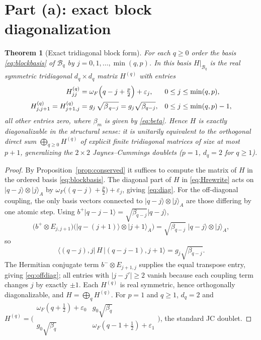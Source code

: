\documentclass[12pt]{article}
\newtheorem{theorem}{Theorem}
\theoremstyle{definition}
\theoremstyle{remark}
\newcommand{\ket}[1]{\lvert #1\rangle}
\newcommand{\bp}{b^{+}}
\newcommand{\bm}{b^{-}}
\begin{document}
\section{Part (a): exact block diagonalization}

\begin{theorem}[Exact tridiagonal block form]\label{thm:blocks}
For each $q\ge0$ order the basis \eqref{eq:blockbasis} of $\mathcal B_q$ by
$j=0,1,\dots,\min(q,p)$. In this basis $H|_{\mathcal B_q}$ is the real symmetric
tridiagonal $d_q\times d_q$ matrix $H^{(q)}$ with entries
\begin{align}
H^{(q)}_{jj}&=\omega_F\Bigl(q-j+\tfrac p2\Bigr)+\varepsilon_j,
&& 0\le j\le \min(q,p),\label{eq:diag}\\
H^{(q)}_{j,j+1}=H^{(q)}_{j+1,j}&=g_j\,\sqrt{\beta_{\,q-j}}
=g_j\sqrt{\beta_{q-j}},
&& 0\le j\le \min(q,p)-1,\label{eq:offdiag}
\end{align}
all other entries zero, where $\beta_m$ is given by \eqref{eq:beta}. Hence $H$ is
exactly diagonalizable in the structural sense: it is unitarily equivalent to the
orthogonal direct sum $\bigoplus_{q\ge0} H^{(q)}$ of explicit finite tridiagonal
matrices of size at most $p+1$, generalizing the $2\times2$ Jaynes--Cummings
doublets ($p=1$, $d_q=2$ for $q\ge1$).
\end{theorem}

\begin{proof}
By Proposition~\ref{prop:conserved} it suffices to compute the matrix of $H$ in the
ordered basis \eqref{eq:blockbasis}. The diagonal part of $H$ in
\eqref{eq:Hrewrite} acts on $\ket{q-j}\otimes\ket j_A$ by
$\omega_F\bigl((q-j)+\frac p2\bigr)+\varepsilon_j$, giving \eqref{eq:diag}. For the
off-diagonal coupling, the only basis vectors connected to $\ket{q-j}\otimes\ket j_A$
are those differing by one atomic step. Using
$\bp\ket{q-j-1}=\sqrt{\beta_{q-j}}\ket{q-j}$,
\[
\bigl(\bp\otimes E_{j,j+1}\bigr)\bigl(\ket{q-(j+1)}\otimes\ket{j+1}_A\bigr)
=\sqrt{\beta_{q-j}}\;\ket{q-j}\otimes\ket{j}_A ,
\]
so
\[
\bigl\langle (q-j),j\bigl|\,H\,\bigr|(q-j-1),j+1\bigr\rangle
=g_j\sqrt{\beta_{q-j}} .
\]
The Hermitian conjugate term $\bm\otimes E_{j+1,j}$ supplies the equal transpose
entry, giving \eqref{eq:offdiag}; all entries with $|j-j'|\ge2$ vanish because each
coupling term changes $j$ by exactly $\pm1$. Each $H^{(q)}$ is real symmetric, hence
orthogonally diagonalizable, and $H=\bigoplus_q H^{(q)}$. For $p=1$ and $q\ge1$,
$d_q=2$ and $H^{(q)}=\bigl(\begin{smallmatrix}\omega_F(q+\frac12)+\varepsilon_0 & g_0\sqrt{\beta_q}\\ g_0\sqrt{\beta_q} & \omega_F(q-1+\frac12)+\varepsilon_1\end{smallmatrix}\bigr)$,
the standard JC doublet.
\end{proof}
\end{document}
